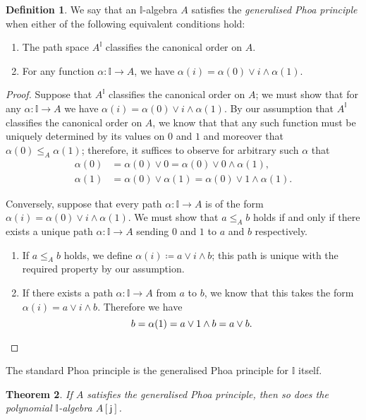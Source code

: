 \documentclass[a4paper,12pt]{amsart}
\newtheorem{theorem}{Theorem}[section]
\theoremstyle{definition}
\newtheorem{definition}[theorem]{Definition}
\newcommand{\mbb}[1]{\mathbb{#1}}
\newcommand{\I}{\mbb I}
\newcommand{\ms}[1]{\mathsf{#1}}
\begin{document}
\begin{definition}
  We say that an $\I$-algebra $A$ satisfies the \emph{generalised Phoa principle} when either of the following equivalent conditions hold:
  \begin{enumerate}
    \item The path space $A^\I$ classifies the canonical order on $A$.
    \item For any function $\alpha\colon \I\to A$, we have $\alpha(i) = \alpha(0)\vee i \wedge \alpha(1)$.
  \end{enumerate}
\end{definition}

\begin{proof}
  Suppose that $A^\I$ classifies the canonical order on $A$; we must show that for any $\alpha\colon \I\to A$ we have $\alpha(i) = \alpha(0)\vee i \wedge \alpha(1)$. By our assumption that $A^\I$ classifies the canonical order on $A$, we know that that any such function must be uniquely determined by its values on $0$ and $1$ and moreover that $\alpha(0) \le_A \alpha(1)$; therefore, it suffices to observe for arbitrary such $\alpha$ that
  \begin{align*}
    \alpha(0) &= \alpha(0) \vee 0 = \alpha(0)\vee 0 \wedge \alpha(1)\text{,}\\
    \alpha(1) &= \alpha(0)\vee\alpha(1) = \alpha(0)\vee 1 \wedge \alpha(1)\text{.}
  \end{align*}

  Conversely, suppose that every path $\alpha\colon \I\to A$ is of the form $\alpha(i) = \alpha(0)\vee i \wedge \alpha(1)$. We must show that $a\le_A b$ holds if and only if there exists a unique path $\alpha\colon \I\to A$ sending $0$ and $1$ to $a$ and $b$ respectively.
  \begin{enumerate}
    \item If $a\le_A b$ holds, we define $\alpha(i) \coloneq a\vee i \wedge b$; this path is unique with the required property by our assumption. 
    \item If there exists a path $\alpha\colon\I\to A$ from $a$ to $b$, we know that this takes the form $\alpha(i) = a \vee i \wedge b$. Therefore we have
    \[ 
      b = \alpha(1) = a\vee 1\wedge b = a \vee b.
      \qedhere
    \] 
  \end{enumerate}
\end{proof}

The standard Phoa principle is the generalised Phoa principle for $\I$ itself.

\begin{theorem}\label{thm:gen-phoa-poly}
  If $A$ satisfies the generalised Phoa principle, then so does the polynomial $\I$-algebra $A[\ms{j}]$.
\end{theorem}
\end{document}
